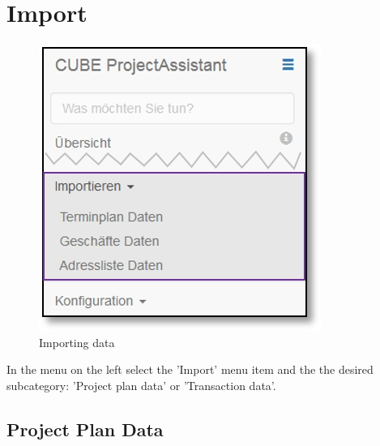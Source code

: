 
\clearpage
\section{Import}

\begin{figure}   %
  \vspace{-35pt}      %
  \begin{center}
    \includegraphics[width=1\linewidth]{../chapters/12_Importieren/pictures/12_Menu_Importieren.jpg}
  \end{center}
  \vspace{-20pt}
  \caption{Importing data}
  \vspace{-10pt}
\end{figure}

In the menu on the left select the 'Import' menu item and the the desired subcategory: 'Project plan data' or 'Transaction data'.

\vspace{6.5cm}

\subsection{Project Plan Data}
\label{bkm:Ref445411998}

